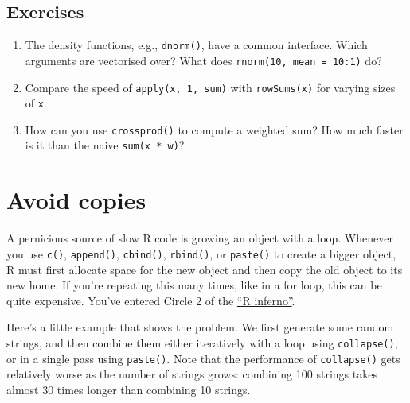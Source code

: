 \hypertarget{exercises-2}{%
\subsection{Exercises}\label{exercises-2}}

\begin{enumerate}
\def\labelenumi{\arabic{enumi}.}
\item
  The density functions, e.g., \texttt{dnorm()}, have a common
  interface. Which arguments are vectorised over? What does
  \texttt{rnorm(10,\ mean\ =\ 10:1)} do?
\item
  Compare the speed of \texttt{apply(x,\ 1,\ sum)} with
  \texttt{rowSums(x)} for varying sizes of \texttt{x}.
\item
  How can you use \texttt{crossprod()} to compute a weighted sum? How
  much faster is it than the naive \texttt{sum(x\ *\ w)}?
\end{enumerate}

\hypertarget{avoid-copies}{%
\section{Avoid copies}\label{avoid-copies}}

A pernicious source of slow R code is growing an object with a loop.
Whenever you use \texttt{c()}, \texttt{append()}, \texttt{cbind()},
\texttt{rbind()}, or \texttt{paste()} to create a bigger object, R must
first allocate space for the new object and then copy the old object to
its new home. If you're repeating this many times, like in a for loop,
this can be quite expensive. You've entered Circle 2 of the
\href{http://www.burns-stat.com/pages/Tutor/R_inferno.pdf}{``R
inferno''}. 

Here's a little example that shows the problem. We first generate some
random strings, and then combine them either iteratively with a loop
using \texttt{collapse()}, or in a single pass using \texttt{paste()}.
Note that the performance of \texttt{collapse()} gets relatively worse
as the number of strings grows: combining 100 strings takes almost 30
times longer than combining 10 strings. 

